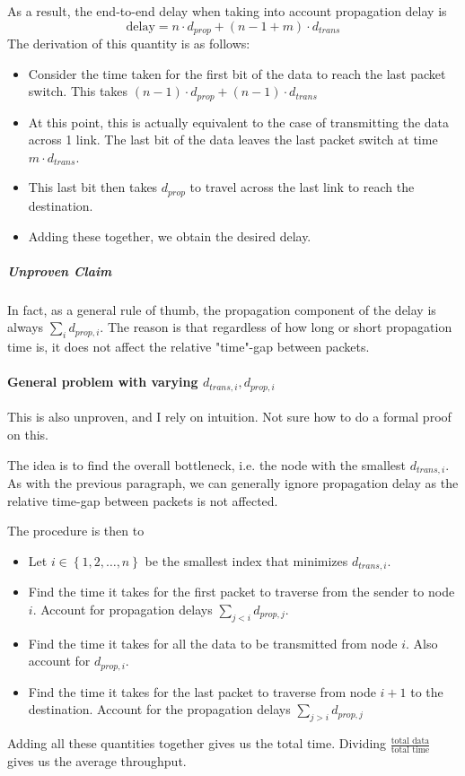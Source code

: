 \documentclass[a4paper]{article}
\newcommand{\set}[1]{\left\lbrace#1\right\rbrace} %
\newcommand{\enum}[1]{1,2,\dots,#1}
\begin{document}
As a result, the end-to-end delay when taking into account propagation delay is
\begin{equation}
	\text{delay} = n\cdot d_{prop} + (n - 1 + m)\cdot d_{trans}
\end{equation}
The derivation of this quantity is as follows:
\begin{itemize}
	\item Consider the time taken for the first bit of the data to reach the last packet switch. This takes $(n-1)\cdot d_{prop} + (n-1)\cdot d_{trans}$
	\item At this point, this is actually equivalent to the case of transmitting the data across 1 link. The last bit of the data leaves the last packet switch at time $m\cdot d_{trans}$.
	\item This last bit then takes $d_{prop}$ to travel across the last link to reach the destination.
	\item Adding these together, we obtain the desired delay.
\end{itemize}

\subparagraph{Unproven Claim}
In fact, as a general rule of thumb, the propagation component of the delay is always $\sum_i d_{prop, i}$. The reason is that regardless of how long or short propagation time is, it does not affect the relative "time"-gap between packets.

\paragraph{General problem with varying $d_{trans,i}, d_{prop,i}$} This is also unproven, and I rely on intuition. Not sure how to do a formal proof on this.

The idea is to find the overall bottleneck, i.e. the node with the smallest $d_{trans, i}$. As with the previous paragraph, we can generally ignore propagation delay as the relative time-gap between packets is not affected.

The procedure is then to
\begin{itemize}
	\item Let $i\in \set{\enum{n}}$ be the smallest index that minimizes $d_{trans, i}$.
	\item Find the time it takes for the first packet to traverse from the sender to node $i$. Account for propagation delays $\sum_{j < i}d_{prop, j}$.
	\item Find the time it takes for all the data to be transmitted from node $i$. Also account for $d_{prop, i}$.
	\item Find the time it takes for the last packet to traverse from node $i+1$ to the destination. Account for the propagation delays $\sum_{j > i}d_{prop, j}$
\end{itemize}
Adding all these quantities together gives us the total time. Dividing $\frac{\text{total data}}{\text{total time}}$ gives us the average throughput.
\end{document}
